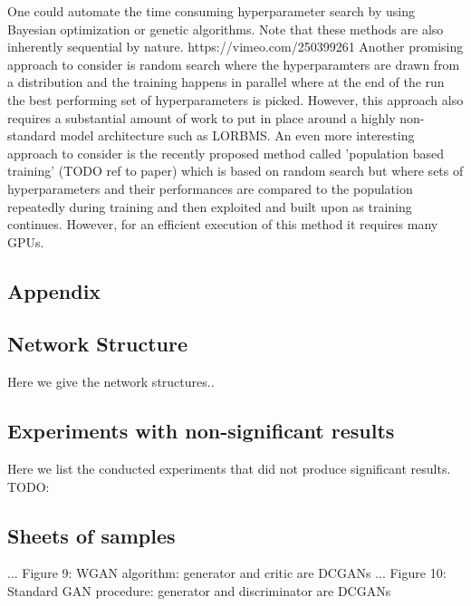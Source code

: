 \documentclass[12pt,a4paper]{article}
\begin{document}
\par One could automate the time consuming hyperparameter search by using Bayesian optimization or genetic algorithms. Note that these methods are also inherently sequential by nature. https://vimeo.com/250399261
Another promising approach to consider is random search where the hyperparamters are drawn from a distribution and the training happens in parallel where at the end of the run the best performing set of hyperparameters is picked. However, this approach also requires a substantial amount of work to put in place around a highly non-standard model architecture such as LORBMS. An even more interesting approach to consider is the recently proposed method called 'population based training' (TODO ref to paper) which is based on random search but where sets of hyperparameters and their performances are compared to the population repeatedly during training and then exploited and built upon as training continues. However, for an efficient execution of this method it requires many GPUs. 

\printbibliography

\begin{appendices}
\section{Appendix}
\subsection{Network Structure}
Here we give the network structures..

\subsection{Experiments with non-significant results}
Here we list the conducted experiments that did not produce significant results. TODO:

\subsection{Sheets of samples}
...
Figure 9: WGAN algorithm: generator and critic are DCGANs
...
Figure 10: Standard GAN procedure: generator and discriminator are DCGANs
\end{appendices}
\end{document}
